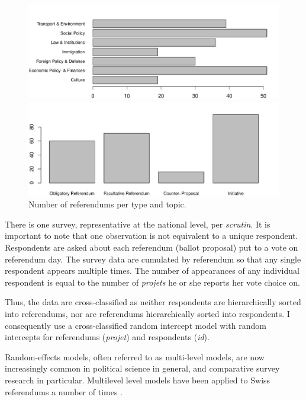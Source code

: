 \documentclass[11pt,a4paper]{article}\usepackage[]{graphicx}\usepackage[]{color}
\makeatletter
\def\maxwidth{ %
  \ifdim\Gin@nat@width>\linewidth
    \linewidth
  \else
    \Gin@nat@width
  \fi
}
\newenvironment{knitrout}{}{} %
\makeatother
\begin{document}
    \begin{figure}
\begin{knitrout}
\color{fgcolor}
\includegraphics[width=\maxwidth]{figure/fig2-1} 

\includegraphics[width=\maxwidth]{figure/fig2-2} 

\end{knitrout}
        \caption{Number of referendums per type and topic.}\label{fig:typetopic}
    \end{figure}
    
    There is one survey, representative at the national level, per \textit{scrutin}. It is important to note that one observation is not equivalent to a unique respondent. Respondents are asked about each referendum (ballot proposal) put to a vote on referendum day. The survey data are cumulated by referendum so that any single respondent appears multiple times. The number of appearances of any individual respondent is equal to the number of \textit{projets} he or she reports her vote choice on. 
    
    Thus, the data are cross-classified as neither respondents are hierarchically sorted into referendums, nor are referendums hierarchically sorted into respondents. I consequently use a cross-classified random intercept model with random intercepts for referendums (\textit{projet}) and respondents (\textit{id}). 
	
	Random-effects models, often referred to as multi-level models, are now increasingly common in political science in general, and comparative survey research in particular. Multilevel level models have been applied to Swiss referendums a number of times \citep[e.g.][]{sciarini_two-level_2009,sciarini_campaign_2011,vatter_who_2014,lanz_vote_2014}. 
	
\end{document}
